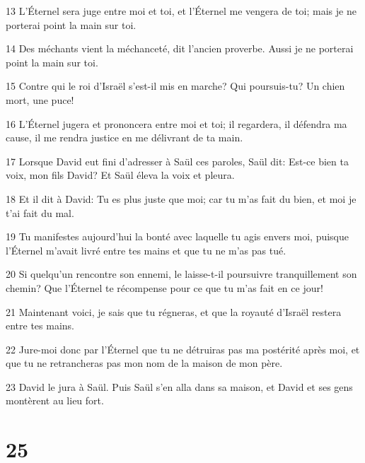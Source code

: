 \par 13 L'Éternel sera juge entre moi et toi, et l'Éternel me vengera de toi; mais je ne porterai point la main sur toi.
\par 14 Des méchants vient la méchanceté, dit l'ancien proverbe. Aussi je ne porterai point la main sur toi.
\par 15 Contre qui le roi d'Israël s'est-il mis en marche? Qui poursuis-tu? Un chien mort, une puce!
\par 16 L'Éternel jugera et prononcera entre moi et toi; il regardera, il défendra ma cause, il me rendra justice en me délivrant de ta main.
\par 17 Lorsque David eut fini d'adresser à Saül ces paroles, Saül dit: Est-ce bien ta voix, mon fils David? Et Saül éleva la voix et pleura.
\par 18 Et il dit à David: Tu es plus juste que moi; car tu m'as fait du bien, et moi je t'ai fait du mal.
\par 19 Tu manifestes aujourd'hui la bonté avec laquelle tu agis envers moi, puisque l'Éternel m'avait livré entre tes mains et que tu ne m'as pas tué.
\par 20 Si quelqu'un rencontre son ennemi, le laisse-t-il poursuivre tranquillement son chemin? Que l'Éternel te récompense pour ce que tu m'as fait en ce jour!
\par 21 Maintenant voici, je sais que tu régneras, et que la royauté d'Israël restera entre tes mains.
\par 22 Jure-moi donc par l'Éternel que tu ne détruiras pas ma postérité après moi, et que tu ne retrancheras pas mon nom de la maison de mon père.
\par 23 David le jura à Saül. Puis Saül s'en alla dans sa maison, et David et ses gens montèrent au lieu fort.

\chapter{25}

